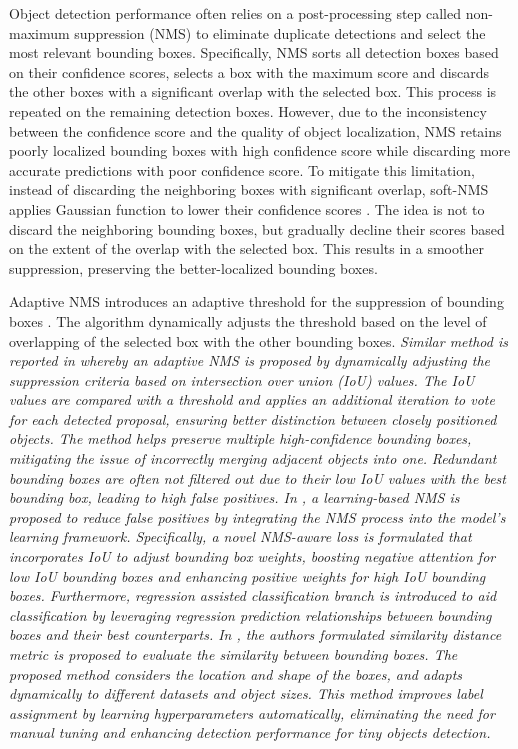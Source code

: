\documentclass[preprint,12pt]{elsarticle}
\begin{document}
Object detection performance often relies on a post-processing step called non-maximum suppression (NMS) to eliminate duplicate detections and select the most relevant bounding boxes. Specifically, NMS sorts all detection boxes based on their confidence scores, selects a box with the maximum score and discards the other boxes with a significant overlap with the selected box. This process is repeated on the remaining detection boxes. However, due to the inconsistency between the confidence score and the quality of object localization, NMS retains poorly localized bounding boxes with high confidence score while discarding more accurate predictions with poor confidence score. To mitigate this limitation, instead of discarding the neighboring boxes with significant overlap, soft-NMS applies Gaussian function to lower their confidence scores \citep{bodla_soft-nmsimproving_2017}. The idea is not to discard the neighboring bounding boxes, but gradually decline their scores based on the extent of the overlap with the selected box. This results in a smoother suppression, preserving the better-localized bounding boxes. 

Adaptive NMS introduces an adaptive threshold for the suppression of bounding boxes \citep{liu_adaptive_2019}. The algorithm dynamically adjusts the threshold based on the level of overlapping of the selected box with the other bounding boxes. \emph{Similar method is reported in \citep{husham_al-badri_adaptive_2023} whereby an adaptive NMS is proposed by dynamically adjusting the suppression criteria based on intersection over union (IoU) values. The IoU values are compared with a threshold and applies an additional iteration to vote for each detected proposal, ensuring better distinction between closely positioned objects. The method helps preserve multiple high-confidence bounding boxes, mitigating the issue of incorrectly merging adjacent objects into one.} \emph{Redundant bounding boxes are often not filtered out due to their low IoU values with the best bounding box, leading to high false positives. In \citep{jiang_non-maximum_2024}, a learning-based NMS is proposed to reduce false positives by integrating the NMS process into the model's learning framework. Specifically, a novel NMS-aware loss is formulated that incorporates IoU to adjust bounding box weights, boosting negative attention for low IoU bounding boxes and enhancing positive weights for high IoU bounding boxes. Furthermore, regression assisted classification branch is introduced to aid classification by leveraging regression prediction relationships between bounding boxes and their best counterparts. In \citep{shi_similarity_2024}, the authors formulated similarity distance metric is proposed to evaluate the similarity between bounding boxes. The proposed method considers the location and shape of the boxes, and adapts dynamically to different datasets and object sizes. This method improves label assignment by learning hyperparameters automatically, eliminating the need for manual tuning and enhancing detection performance for tiny objects detection.}
\end{document}
